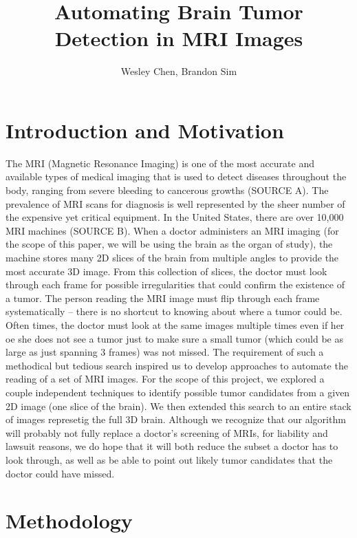 \documentclass[12pt]{article}
\theoremstyle{plain}%
\theoremstyle{definition}
\theoremstyle{remark}
\begin{document}
\title{Automating Brain Tumor Detection in MRI Images}
\author{Wesley Chen, Brandon Sim}

\maketitle
\tableofcontents
\newpage

\section{Introduction and Motivation}

The MRI (Magnetic Resonance Imaging) is one of the most accurate and available types of medical imaging that is used to detect diseases throughout the body, ranging from severe bleeding to cancerous growths (SOURCE A).  The prevalence of MRI scans for diagnosis is well represented by the sheer number of the expensive yet critical equipment.  In the United States, there are over 10,000 MRI machines (SOURCE B).  When a doctor administers an MRI imaging (for the scope of this paper, we will be using the brain as the organ of study), the machine stores many 2D slices of the brain from multiple angles to provide the most accurate 3D image.  From this collection of slices, the doctor must look through each frame for possible irregularities that could confirm the existence of a tumor.  The person reading the MRI image must flip through each frame systematically – there is no shortcut to knowing about where a tumor could be.  Often times, the doctor must look at the same images multiple times even if her oe she does not see a tumor just to make sure a small tumor (which could be as large as just spanning 3 frames) was not missed.  The requirement of such a methodical but tedious search inspired us to develop approaches to automate the reading of a set of MRI images.  For the scope of this project, we explored a couple independent techniques to identify possible tumor candidates from a given 2D image (one slice of the brain).  We then extended this search to an entire stack of images represetig the full 3D brain.  Although we recognize that our algorithm will probably not fully replace a doctor's screening of MRIs, for liability and lawsuit reasons, we do hope that it will both reduce the subset a doctor has to look through, as well as be able to point out likely tumor candidates that the doctor could have missed.

\section{Methodology}
\end{document}
